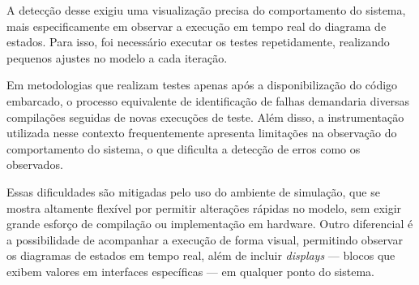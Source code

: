 A detecção desse exigiu uma visualização precisa do comportamento do sistema, mais especificamente em observar a execução em tempo real do diagrama de estados. Para 
isso, foi necessário executar os testes repetidamente, realizando pequenos ajustes no modelo a cada iteração.

Em metodologias que realizam testes apenas após a disponibilização do código embarcado, o processo equivalente de identificação de falhas demandaria diversas 
compilações seguidas de novas execuções de teste. Além disso, a instrumentação utilizada nesse contexto frequentemente apresenta limitações na observação do 
comportamento do sistema, o que dificulta a detecção de erros como os observados.

Essas dificuldades são mitigadas pelo uso do ambiente de simulação, que se mostra altamente flexível por permitir alterações rápidas no modelo, sem exigir grande 
esforço de compilação ou implementação em hardware. Outro diferencial é a possibilidade de acompanhar a execução de forma visual, permitindo observar os diagramas 
de estados em tempo real, além de incluir \textit{displays} — blocos que exibem valores em interfaces específicas — em qualquer ponto do sistema.
